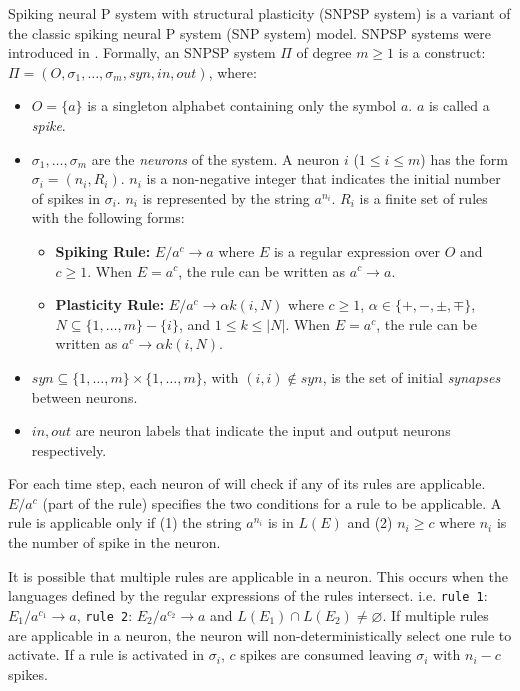 \documentclass[smallextended]{svjour3}
\begin{document}
Spiking neural P system with structural plasticity (SNPSP system) is a variant of the classic spiking neural P system (SNP system) model. SNPSP 
systems were introduced in \cite{SNPSP}. Formally, an SNPSP system $\Pi$ of degree $m \geq 1$ is  {a} construct: $\Pi =(O, \sigma_1,\ldots, \sigma_m, 
syn, in, out)$, where:

\begin{itemize}[label=$\circ$]
   \item  $O = \{a\}$ is a singleton alphabet containing only the symbol $a$. $a$ is called a \textit{spike}.
   \item $\sigma_1, \ldots, \sigma_m$ are the \textit{neurons} of the system. A neuron $i$ ($1 \leq i \leq m$) has the form $\sigma_i = (n_i, R_i)$. 
          $n_i$ is a non-negative integer that indicates the initial number of spikes in $\sigma_i$. $n_i$ is represented by the string $a^{n_i}$. 
          $R_i$ is a finite set of rules with the following forms:
          \begin{itemize}
             \item \textbf{Spiking Rule:} $E/a^c \rightarrow a$ where $E$ is a regular expression over $O$ and $c \geq 1$. When $E=a^c$, the rule can 
                   be written as $a^c \rightarrow a$.
             \item \textbf{Plasticity Rule:} $E/a^c \rightarrow \alpha k(i,N)$ where $c \geq 1$, $\alpha \in \{+,-,\pm,\mp\}$, $N \subseteq \{1,
                   \ldots,m\}-\{i\}$, and  $1 \leq k \leq |N|$. When $E=a^c$, the rule can be written as $a^c \rightarrow \alpha k(i,N)$.
          \end{itemize}
   \item $syn \subseteq \{1,\ldots,m\} \times \{1,\ldots,m\}$, with $(i,i) \not\in syn$, is the set of initial \textit{synapses} between neurons.
   \item $in,out$ are neuron labels that indicate the input and output neurons respectively.
\end{itemize}
  

 
For each time step, each neuron of will check if any of its rules are applicable. $E/a^c$ (part of the rule) specifies the two conditions for a rule
to be applicable. A rule is applicable only if (1) the string $a^{n_i}$ is in $L(E)$ and  (2) $n_i \geq c$ where $n_i$ is the number of spike in the
neuron.

It is possible that multiple rules are applicable in a neuron. This occurs when the languages defined by the regular expressions of the rules 
intersect. i.e. \texttt{rule 1}: $E_1/a^{c_1} \rightarrow a$, \texttt{rule 2}: $E_2/a^{c_2} \rightarrow a$ and $L(E_1) \cap L(E_2) \neq \varnothing$. 
If multiple rules are applicable in a neuron, the neuron will non-deterministically select one rule to activate. If a rule is activated in $\sigma_i$,
$c$ spikes are consumed leaving $\sigma_i$ with $n_i-c$ spikes.
  
\end{document}
